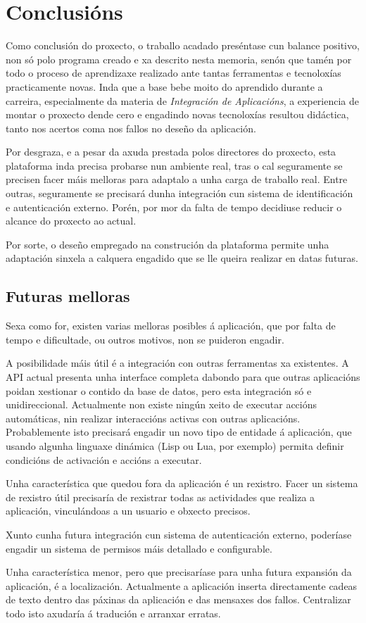 \chapter{Conclusións}
\label{chap:conclusions}

Como conclusión do proxecto, o traballo acadado preséntase cun balance positivo, non só polo programa creado e xa descrito nesta memoria, senón que tamén por todo o proceso de aprendizaxe realizado ante tantas ferramentas e tecnoloxías practicamente novas. Inda que a base bebe moito do aprendido durante a carreira, especialmente da materia de \textit{Integración de Aplicacións}, a experiencia de montar o proxecto dende cero e engadindo novas tecnoloxías resultou didáctica, tanto nos acertos coma nos fallos no deseño da aplicación.

Por desgraza, e a pesar da axuda prestada polos directores do proxecto, esta plataforma inda precisa probarse nun ambiente real, tras o cal seguramente se precisen facer máis melloras para adaptalo a unha carga de traballo real. Entre outras, seguramente se precisará dunha integración cun sistema de identificación e autenticación externo. Porén, por mor da falta de tempo decidiuse reducir o alcance do proxecto ao actual.

Por sorte, o deseño empregado na construción da plataforma permite unha adaptación sinxela a calquera engadido que se lle queira realizar en datas futuras.

\section{Futuras melloras}

Sexa como for, existen varias melloras posibles á aplicación, que por falta de tempo e dificultade, ou outros motivos, non se puideron engadir.

A posibilidade máis útil é a integración con outras ferramentas xa existentes. A API actual presenta unha interface completa dabondo para que outras aplicacións poidan xestionar o contido da base de datos, pero esta integración só e unidireccional. Actualmente non existe ningún xeito de executar accións automáticas, nin realizar interaccións activas con outras aplicacións. Probablemente isto precisará engadir un novo tipo de entidade á aplicación, que usando algunha linguaxe dinámica (Lisp ou Lua, por exemplo) permita definir condicións de activación e accións a executar.

\newpage

Unha característica que quedou fora da aplicación é un rexistro. Facer un sistema de rexistro útil precisaría de rexistrar todas as actividades que realiza a aplicación, vinculándoas a un usuario e obxecto precisos.

Xunto cunha futura integración cun sistema de autenticación externo, poderíase engadir un sistema de permisos máis detallado e configurable.

Unha característica menor, pero que precisaríase para unha futura expansión da aplicación, é a localización. Actualmente a aplicación inserta directamente cadeas de texto dentro das páxinas da aplicación e das mensaxes dos fallos. Centralizar todo isto axudaría á tradución e arranxar erratas.